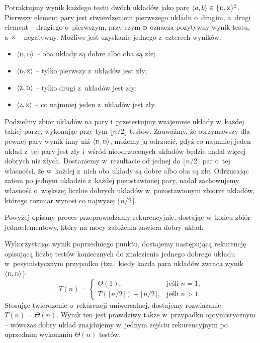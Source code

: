 \subproblem %
Potraktujmy wynik każdego testu dwóch układów jako parę $\langle a,b\rangle\in\{{\scriptstyle\rm D},{\scriptstyle\rm Z}\}^2$.
Pierwszy element pary jest stwierdzeniem pierwszego układu o~drugim, a~drugi element -- drugiego o~pierwszym, przy czym ${\scriptstyle\rm D}$ oznacza pozytywny wynik testu, a~${\scriptstyle\rm Z}$ -- negatywny.
Możliwe jest uzyskanie jednego z~czterech wyników:
\begin{itemize}
	\item $\langle{\scriptstyle\rm D},{\scriptstyle\rm D}\rangle$ -- oba układy są dobre albo oba są złe;
	\item $\langle{\scriptstyle\rm D},{\scriptstyle\rm Z}\rangle$ -- tylko pierwszy z~układów jest zły;
	\item $\langle{\scriptstyle\rm Z},{\scriptstyle\rm D}\rangle$ -- tylko drugi z~układów jest zły;
	\item $\langle{\scriptstyle\rm Z},{\scriptstyle\rm Z}\rangle$ -- co najmniej jeden z~układów jest zły.
\end{itemize}

Podzielmy zbiór układów na pary i~przetestujmy wzajemnie układy w~każdej takiej parze, wykonując przy tym $\lfloor n/2\rfloor$ testów.
Zauważmy, że otrzymawszy dla pewnej pary wynik inny niż $\langle{\scriptstyle\rm D},{\scriptstyle\rm D}\rangle$, możemy ją odrzucić, gdyż co najmniej jeden układ z~tej pary jest zły i~wśród nieodrzuconych układów będzie nadal więcej dobrych niż złych.
Dostaniemy w~rezultacie od jednej do $\lfloor n/2\rfloor$ par o~tej własności, że w~każdej z~nich oba układy są dobre albo oba są złe.
Odrzucając zatem po jednym układzie z~każdej pozostawionej pary, nadal zachowujemy własność o~większej liczbie dobrych układów w~pozostawionym zbiorze układów, którego rozmiar wynosi co najwyżej $\lceil n/2\rceil$.

Powyżej opisany proces przeprowadzamy rekurencyjnie, dostając w~końcu zbiór jednoelementowy, który na mocy założenia zawiera dobry układ.

\subproblem %
Wykorzystując wynik poprzedniego punktu, dostajemy następującą rekurencję opisującą liczbę testów koniecznych do znalezienia jednego dobrego układu w~pesymistycznym przypadku (tzn.\ kiedy każda para układów zwraca wynik $\langle{\scriptstyle\rm D},{\scriptstyle\rm D}\rangle$):
\[
	T(n) =
	\begin{cases}
		\Theta(1), & \text{jeśli $n=1$}, \\
		T(\lceil n/2\rceil)+\lfloor n/2\rfloor, & \text{jeśli $n>1$}.
	\end{cases}
\]
Stosując twierdzenie o~rekurencji uniwersalnej, dostajemy rozwiązanie: $T(n)=\Theta(n)$.
Wynik ten jest prawdziwy także w~przypadku optymistycznym -- wówczas dobry układ znajdujemy w~jednym zejściu rekurencyjnym po uprzednim wykonaniu $\Theta(n)$ testów.


